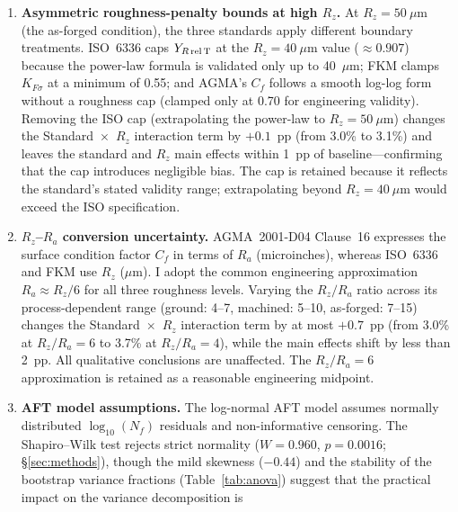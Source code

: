 \documentclass[12pt,a4paper]{article}
\begin{document}
\begin{enumerate}
        contribution of the uniform $Y_{Sa}$ simplification to 2--6~pp, but a
        fully native implementation of all three standards' complete
        calculation chains remains a necessary follow-up study.
  \item \textbf{Asymmetric roughness-penalty bounds at high $R_z$.} At
        $R_z = 50~\mu$m (the as-forged condition), the three standards
        apply different boundary treatments. ISO~6336 caps
        $Y_{R\,\rm rel\,T}$ at the $R_z = 40~\mu$m value
        ($\approx 0.907$) because the power-law formula is validated only
        up to 40~$\mu$m; FKM clamps $K_{F\sigma}$ at a minimum of 0.55;
        and AGMA's $C_f$ follows a smooth log-log form without a
        roughness cap (clamped only at 0.70 for engineering validity).
        Removing the ISO cap (extrapolating the power-law to
        $R_z=50~\mu$m) changes the Standard~$\times$~$R_z$ interaction
        term by $+0.1$~pp (from 3.0\% to 3.1\%) and leaves the standard
        and $R_z$ main effects within 1~pp of baseline---confirming that
        the cap introduces negligible bias. The cap is retained because
        it reflects the standard's stated validity range; extrapolating
        beyond $R_z = 40~\mu$m would exceed the ISO specification.
  \item \textbf{$R_z$--$R_a$ conversion uncertainty.} AGMA~2001-D04
        Clause~16 expresses the surface condition factor $C_f$ in terms
        of $R_a$ (microinches), whereas ISO~6336 and FKM use $R_z$
        ($\mu$m). I adopt the common engineering approximation
        $R_a \approx R_z/6$ for all three roughness levels. Varying the
        $R_z/R_a$ ratio across its process-dependent range (ground: 4--7,
        machined: 5--10, as-forged: 7--15) changes the
        Standard~$\times$~$R_z$ interaction term by at most $+0.7$~pp
        (from 3.0\% at $R_z/R_a=6$ to 3.7\% at $R_z/R_a=4$), while the
        main effects shift by less than 2~pp. All qualitative
        conclusions are unaffected. The $R_z/R_a=6$ approximation is
        retained as a reasonable engineering midpoint.
  \item \textbf{AFT model assumptions.} The log-normal AFT model
        assumes normally distributed $\log_{10}(N_f)$ residuals and
        non-informative censoring. The Shapiro--Wilk test rejects
        strict normality ($W=0.960$, $p=0.0016$; \S\ref{sec:methods}),
        though the mild skewness ($-0.44$) and the stability of the
        bootstrap variance fractions (Table~\ref{tab:anova}) suggest
        that the practical impact on the variance decomposition is

\end{enumerate}
\end{document}
